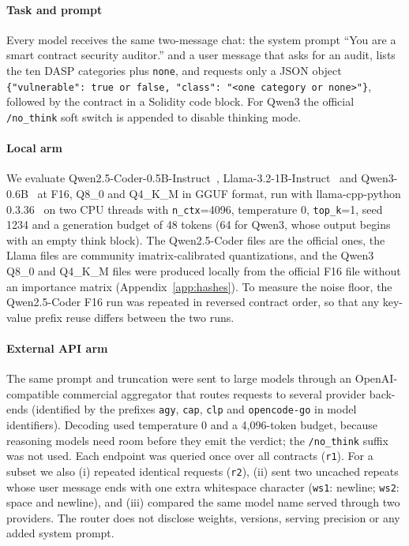 \paragraph{Task and prompt}
Every model receives the same two-message chat: the system prompt ``You are a smart contract security auditor.'' and a user message that asks for an audit, lists the ten DASP categories plus \texttt{none}, and requests only a JSON object \texttt{\{"vulnerable": true or false, "class": "<one category or none>"\}}, followed by the contract in a Solidity code block. For Qwen3 the official \texttt{/no\_think} soft switch is appended to disable thinking mode.

\paragraph{Local arm}
We evaluate Qwen2.5-Coder-0.5B-Instruct~\cite{hui2024qwen25coder}, Llama-3.2-1B-Instruct~\cite{grattafiori2024llama3} and Qwen3-0.6B~\cite{yang2025qwen3} at F16, Q8\_0 and Q4\_K\_M in GGUF format, run with llama-cpp-python 0.3.36~\cite{llamacpppython} on two CPU threads with \texttt{n\_ctx}=4096, temperature 0, \texttt{top\_k}=1, seed 1234 and a generation budget of 48 tokens (64 for Qwen3, whose output begins with an empty think block). The Qwen2.5-Coder files are the official ones, the Llama files are community imatrix-calibrated quantizations, and the Qwen3 Q8\_0 and Q4\_K\_M files were produced locally from the official F16 file without an importance matrix (Appendix~\ref{app:hashes}). To measure the noise floor, the Qwen2.5-Coder F16 run was repeated in reversed contract order, so that any key-value prefix reuse differs between the two runs.

\paragraph{External API arm}
The same prompt and truncation were sent to large models through an OpenAI-compatible commercial aggregator that routes requests to several provider back-ends (identified by the prefixes \texttt{agy}, \texttt{cap}, \texttt{clp} and \texttt{opencode-go} in model identifiers). Decoding used temperature 0 and a 4{,}096-token budget, because reasoning models need room before they emit the verdict; the \texttt{/no\_think} suffix was not used. Each endpoint was queried once over all contracts (\texttt{r1}). For a subset we also (i) repeated identical requests (\texttt{r2}), (ii) sent two uncached repeats whose user message ends with one extra whitespace character (\texttt{ws1}: newline; \texttt{ws2}: space and newline), and (iii) compared the same model name served through two providers. The router does not disclose weights, versions, serving precision or any added system prompt.

